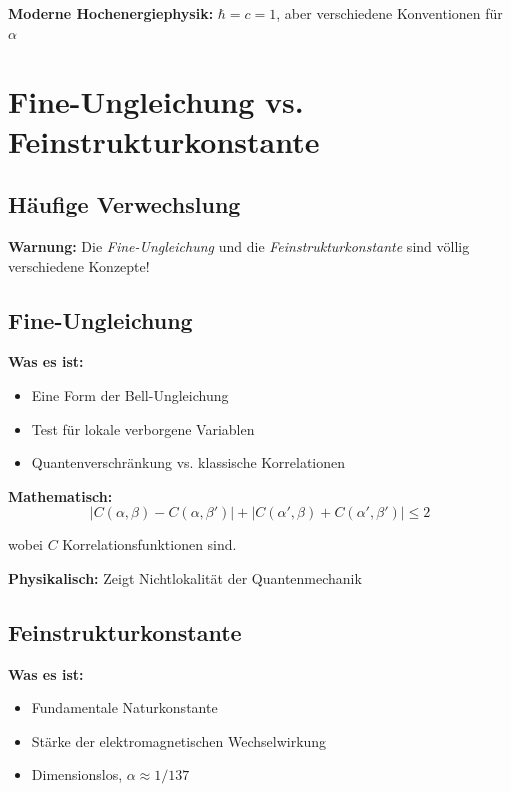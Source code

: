	\textbf{Moderne Hochenergiephysik:} $\hbar = c = 1$, aber verschiedene Konventionen für $\alpha$
	
	\section{Fine-Ungleichung vs. Feinstrukturkonstante}
	
	\subsection{Häufige Verwechslung}
	
	\textbf{Warnung:} Die \textit{Fine-Ungleichung} und die \textit{Feinstrukturkonstante} sind völlig verschiedene Konzepte!
	
	\subsection{Fine-Ungleichung}
	
	\textbf{Was es ist:}
	\begin{itemize}
		\item Eine Form der Bell-Ungleichung
		\item Test für lokale verborgene Variablen
		\item Quantenverschränkung vs. klassische Korrelationen
	\end{itemize}
	
	\textbf{Mathematisch:}
	\begin{equation}
		|C(\alpha, \beta) - C(\alpha, \beta')| + |C(\alpha', \beta) + C(\alpha', \beta')| \leq 2
	\end{equation}
	
	wobei $C$ Korrelationsfunktionen sind.
	
	\textbf{Physikalisch:} Zeigt Nichtlokalität der Quantenmechanik
	
	\subsection{Feinstrukturkonstante}
	
	\textbf{Was es ist:}
	\begin{itemize}
		\item Fundamentale Naturkonstante
		\item Stärke der elektromagnetischen Wechselwirkung
		\item Dimensionslos, $\alpha \approx 1/137$
	\end{itemize}
	
